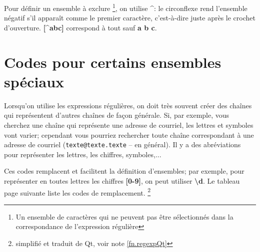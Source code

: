 Pour définir un ensemble à exclure \footnote{Un ensemble de caractères qui ne peuvent pas être sélectionnés dans la correspondance de l'expression régulière}, on utilise \og\textbf{\^{}}\fg: le circonflexe rend l'ensemble négatif s'il apparaît comme le premier caractère, c'est-à-dire juste après le crochet d'ouverture. \textbf{[\^{}abc]} correspond à tout sauf \textbf{a b c}.

\section{Codes pour certains ensembles spéciaux}

Lorsqu'on utilise les expressions régulières, on doit très souvent créer des chaînes qui représentent d'autres chaînes de façon générale. Si, par exemple, vous cherchez une chaîne qui représente une adresse de courriel, les lettres et symboles vont varier; cependant vous pourriez rechercher toute chaîne correspondant à une adresse de courriel (\texttt{texte@texte.texte} -- en général). Il y a des abréviations pour représenter les lettres, les chiffres, symboles,...

Ces codes remplacent et facilitent la définition d'ensembles; par exemple, pour représenter en toutes lettres les chiffres \textbf{[0-9]}, on peut utiliser \og\textbf{\textbackslash{}d}\fg. Le tableau page suivante liste les codes de remplacement. \footnote{simplifié et traduit de Qt, voir note \ref{fn.regexpQt}}
\smallskip

